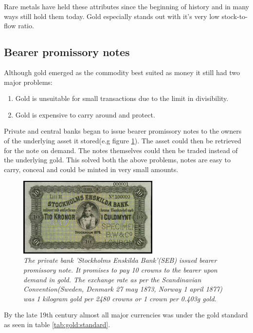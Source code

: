 Rare metals have held these attributes since the beginning of history and in many ways still hold them today. Gold especially stands out with it's very low stock-to-flow ratio.

\subsection{Bearer promissory notes}

Although gold emerged as the commodity best suited as money
it still had two major problems:

\begin{enumerate}
	\item Gold is unsuitable for small transactions due to the limit in divisibility.
	\item Gold is expensive to carry around and protect.
\end{enumerate}

Private and central banks began to issue bearer promissory notes to the owners of the underlying asset it stored(e.g figure \ref{fig:seb:promissory:note}). 
The asset could then be retrieved for the note on demand. The notes themselves could then be traded 
instead of the underlying gold. This solved both the above problems, notes are easy to carry, conceal and 
could be minted in very small amounts. 

\begin{figure}[!htb]
	\centering
	\includegraphics[width=7cm]{PrivateBankNoteStockholmEnskildaBank1876.JPG}
	\caption{\textit{The private bank 'Stockholms Enskilda Bank'(SEB) issued bearer
	promissory note. It promises to pay 10 crowns to the bearer upon demand in gold. 
	The exchange rate as per the Scandinavian Convention(Sweden, Denmark 27 may 1873, Norway 1 april 1877)\cite{nordic:crown}
	was 1 kilogram gold per 2480 crowns or 1 crown per 0.403g gold\cite{crown:gold}. 
 }}
	\label{fig:seb:promissory:note}
\end{figure}

By the late 19th century almost all major currencies was under the gold standard as seen in table \ref{tab:gold:standard}.

